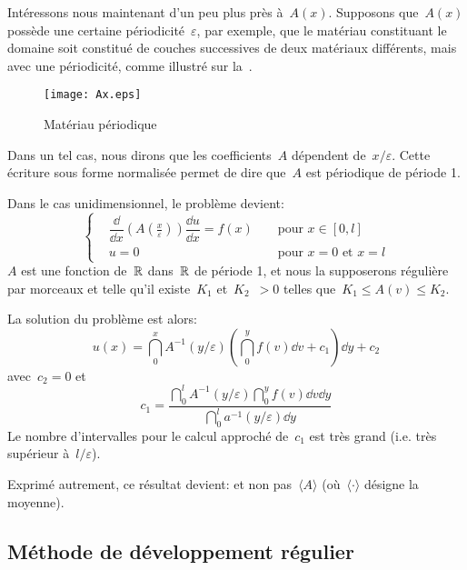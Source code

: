\medskip
Intéressons nous maintenant d'un peu plus près à~$A(x)$.
Supposons que~$A(x)$ possède une certaine périodicité~$\varepsilon$, par exemple, que le matériau constituant le domaine soit constitué de couches successives de deux matériaux différents, mais avec une périodicité, comme illustré sur la~.
\begin{figure}[ht]
\centering\texttt{[image: Ax.eps]}
\caption{Matériau périodique}\label{Fig-Ax}
\end{figure}
Dans un tel cas, nous dirons que les coefficients~$A$ dépendent de~$x/\varepsilon$. Cette écriture sous forme normalisée permet de dire que~$A$ est périodique de période 1.

\medskip
Dans le cas unidimensionnel, le problème devient:
\begin{equation}
\left\{
\begin{aligned}
&\dfrac \dd{\dd x}\left(A\left(\frac x\varepsilon\right)\right) \dfrac{\dd u}{\dd x} = f(x)&& \text{ pour } x\in[0,l]\\
&u=0 &&\text{ pour } x=0 \text{ et } x=l
\end{aligned}
\right.
\end{equation}
$A$ est une fonction de~$\mathbb R$ dans~$\mathbb R$ de période 1, et nous la supposerons régulière par morceaux et telle qu'il existe~$K_1$ et~$K_2$~$>0$ telles que~$K_1\le A(v)\le K_2$.

\medskip
La solution du problème est alors:
\begin{equation}
u(x)=\dint_0^x A^{-1}(y/\varepsilon) \left(\dint_0^y f(v)\dd v + c_1 \right) \dd y + c_2
\end{equation}
avec~$c_2=0$ et
\begin{equation} c_1 = \dfrac{\dint_0^l A^{-1}(y/\varepsilon)\dint_0^y f(v)\dd v \dd y}{\dint_0^l a^{-1}(y/\varepsilon)\dd y} \end{equation}
Le nombre d'intervalles pour le calcul approché de~$c_1$ est très grand (i.e. très supérieur à~$l/\varepsilon$).

Exprimé autrement, ce résultat devient:  et non pas~$\langle A\rangle$ (où~$\langle\cdot\rangle$ désigne la moyenne).


\medskip
\subsection{Méthode de développement régulier}

